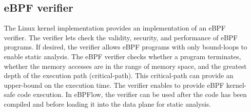 



\subsection{eBPF verifier}
\label{sec:verifier}

The Linux kernel implementation provides an implementation of an eBPF verifier.
The verifier lets check the validity, security, and performance of eBPF programs.
If desired, the verifier allows eBPF programs with only bound-loops to enable static analysis.
The eBPF verifier checks whether a program terminates, whether the memory accesses are in the range of memory space, and the greatest depth of the execution path (critical-path).
This critical-path can provide an upper-bound on the execution time.
The verifier enables to provide eBPF kernel-safe code execution.
In eBPFlow, the verifier can be used after the code has been compiled and before loading it into the data plane for static analysis.

